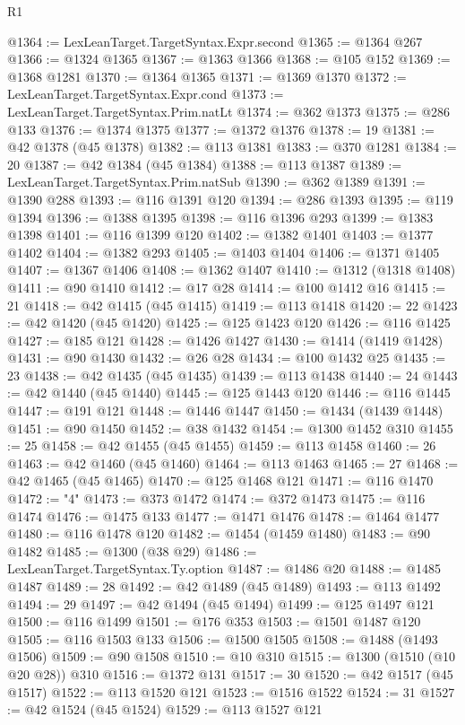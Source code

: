 \begin{lexlean}{R1}
\begin{coremodule}
@1364 := LexLeanTarget.TargetSyntax.Expr.second
@1365 := @1364 @267
@1366 := @1324 @1365
@1367 := @1363 @1366
@1368 := @105 @152
@1369 := @1368 @1281
@1370 := @1364 @1365
@1371 := @1369 @1370
@1372 := LexLeanTarget.TargetSyntax.Expr.cond
@1373 := LexLeanTarget.TargetSyntax.Prim.natLt
@1374 := @362 @1373
@1375 := @286 @133
@1376 := @1374 @1375
@1377 := @1372 @1376
@1378 := 19
@1381 := @42 @1378 (@45 @1378)
@1382 := @113 @1381
@1383 := @370 @1281
@1384 := 20
@1387 := @42 @1384 (@45 @1384)
@1388 := @113 @1387
@1389 := LexLeanTarget.TargetSyntax.Prim.natSub
@1390 := @362 @1389
@1391 := @1390 @288
@1393 := @116 @1391 @120
@1394 := @286 @1393
@1395 := @119 @1394
@1396 := @1388 @1395
@1398 := @116 @1396 @293
@1399 := @1383 @1398
@1401 := @116 @1399 @120
@1402 := @1382 @1401
@1403 := @1377 @1402
@1404 := @1382 @293
@1405 := @1403 @1404
@1406 := @1371 @1405
@1407 := @1367 @1406
@1408 := @1362 @1407
@1410 := @1312 (@1318 @1408)
@1411 := @90 @1410
@1412 := @17 @28
@1414 := @100 @1412 @16
@1415 := 21
@1418 := @42 @1415 (@45 @1415)
@1419 := @113 @1418
@1420 := 22
@1423 := @42 @1420 (@45 @1420)
@1425 := @125 @1423 @120
@1426 := @116 @1425
@1427 := @185 @121
@1428 := @1426 @1427
@1430 := @1414 (@1419 @1428)
@1431 := @90 @1430
@1432 := @26 @28
@1434 := @100 @1432 @25
@1435 := 23
@1438 := @42 @1435 (@45 @1435)
@1439 := @113 @1438
@1440 := 24
@1443 := @42 @1440 (@45 @1440)
@1445 := @125 @1443 @120
@1446 := @116 @1445
@1447 := @191 @121
@1448 := @1446 @1447
@1450 := @1434 (@1439 @1448)
@1451 := @90 @1450
@1452 := @38 @1432
@1454 := @1300 @1452 @310
@1455 := 25
@1458 := @42 @1455 (@45 @1455)
@1459 := @113 @1458
@1460 := 26
@1463 := @42 @1460 (@45 @1460)
@1464 := @113 @1463
@1465 := 27
@1468 := @42 @1465 (@45 @1465)
@1470 := @125 @1468 @121
@1471 := @116 @1470
@1472 := "4"
@1473 := @373 @1472
@1474 := @372 @1473
@1475 := @116 @1474
@1476 := @1475 @133
@1477 := @1471 @1476
@1478 := @1464 @1477
@1480 := @116 @1478 @120
@1482 := @1454 (@1459 @1480)
@1483 := @90 @1482
@1485 := @1300 (@38 @29)
@1486 := LexLeanTarget.TargetSyntax.Ty.option
@1487 := @1486 @20
@1488 := @1485 @1487
@1489 := 28
@1492 := @42 @1489 (@45 @1489)
@1493 := @113 @1492
@1494 := 29
@1497 := @42 @1494 (@45 @1494)
@1499 := @125 @1497 @121
@1500 := @116 @1499
@1501 := @176 @353
@1503 := @1501 @1487 @120
@1505 := @116 @1503 @133
@1506 := @1500 @1505
@1508 := @1488 (@1493 @1506)
@1509 := @90 @1508
@1510 := @10 @310
@1515 := @1300 (@1510 (@10 @20 @28)) @310
@1516 := @1372 @131
@1517 := 30
@1520 := @42 @1517 (@45 @1517)
@1522 := @113 @1520 @121
@1523 := @1516 @1522
@1524 := 31
@1527 := @42 @1524 (@45 @1524)
@1529 := @113 @1527 @121

\end{coremodule}
\end{lexlean}
